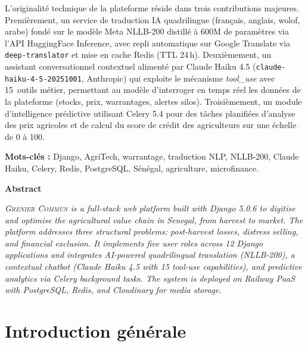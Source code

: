 \documentclass[12pt,a4paper,twoside]{report}
\newcommand{\gc}{\textsc{Grenier Commun}}
\begin{document}
L'originalité technique de la plateforme réside dans trois contributions majeures.
Premièrement, un service de traduction IA quadrilingue (français, anglais, wolof,
arabe) fondé sur le modèle Meta NLLB-200 distillé à 600M de paramètres via l'API
HuggingFace Inference, avec repli automatique sur Google Translate via
\texttt{deep-translator} et mise en cache Redis (TTL 24\,h). Deuxièmement, un
assistant conversationnel contextuel alimenté par Claude Haiku 4.5
(\texttt{claude-haiku-4-5-20251001}, Anthropic) qui exploite le mécanisme
\emph{tool\_use} avec 15~outils métier, permettant au modèle d'interroger en
temps réel les données de la plateforme (stocks, prix, warrantages, alertes silos).
Troisièmement, un module d'intelligence prédictive utilisant Celery 5.4 pour des
tâches planifiées d'analyse des prix agricoles et de calcul du score de crédit
des agriculteurs sur une échelle de 0 à 100.

\textbf{Mots-clés :} Django, AgriTech, warrantage, traduction NLP, NLLB-200, Claude
Haiku, Celery, Redis, PostgreSQL, Sénégal, agriculture, microfinance.

\vspace{1.2cm}
\noindent\textbf{Abstract}

\textit{\gc{} is a full-stack web platform built with Django 5.0.6 to digitise and
optimise the agricultural value chain in Senegal, from harvest to market. The platform
addresses three structural problems: post-harvest losses, distress selling, and
financial exclusion. It implements five user roles across 12 Django applications and
integrates AI-powered quadrilingual translation (NLLB-200), a contextual chatbot
(Claude Haiku 4.5 with 15 tool-use capabilities), and predictive analytics via Celery
background tasks. The system is deployed on Railway PaaS with PostgreSQL, Redis, and
Cloudinary for media storage.}

\tableofcontents
{}

\clearpage
\listoffigures
{}

\clearpage
\listoftables
{}

\setcounter{page}{1}

\chapter{Introduction générale}
\end{document}

